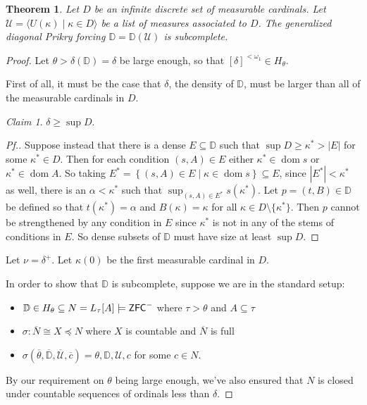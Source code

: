 \documentclass{amsart}
\newtheorem{theorem}{Theorem}[section]
\theoremstyle{definition}
\theoremstyle{remark}
\newtheorem{claimno}{Claim}
\newcommand{\D}{\mathbb{D}}
\newcommand{\N}{{\overline{N}}}
\newcommand{\U}{\mathcal{U}}
\newcommand{\ZFC}{\textup{\ensuremath{\textsf{ZFC}}}}
\DeclareMathOperator{\otp}{otp}
\DeclareMathOperator{\dom}{dom}
\newcommand{\st}{\; | \;}
\newcommand{\set}[2]{\left\{#1\st #2 \right\}}
\begin{document}
\begin{theorem} Let $D$ be an infinite discrete set of measurable cardinals. %
Let $\U = \langle U(\kappa) \;|\; \kappa \in D \rangle$ be a list of measures associated to $D$. The generalized diagonal Prikry forcing $\D=\D(\U)$ is subcomplete. \end{theorem}
\begin{proof} 
Let $\theta > \delta(\D) =\delta$ be large enough, so that $[\delta]^{<\omega_1} \in H_\theta$. 

First of all, it must be the case that $\delta$, the density of $\D$, must be larger than all of the measurable cardinals in $D$.
\begin{claimno} $\delta \geq \sup D$. \end{claimno}
\begin{proof}[Pf.] Suppose instead that there is a dense $E \subseteq \D$ such that $\sup D \geq \kappa^* >|E|$ for some $\kappa^* \in D$. Then for each condition $(s,A) \in E$ either $\kappa^* \in \dom s$ or $\kappa^* \in \dom A$. So taking $E^*=\set{ (s, A) \in E }{ \kappa \in \dom s } \subseteq E$, since $|E^*| < \kappa^*$ as well, there is an $\alpha<\kappa^*$ such that $\sup_{(s,A) \in E^*} s(\kappa^*)$. Let $p=(t, B) \in \D$ be defined so that $t(\kappa^*)=\alpha$ and $B(\kappa)=\kappa$ for all $\kappa \in D \setminus \{ \kappa^*\}$. Then $p$ cannot be strengthened by any condition in $E$ since $\kappa^*$ is not in any of the stems of conditions in $E$. So dense subsets of $\D$ must have size at least $\sup D$.\end{proof}

Let $\nu = \delta^+$. Let $\kappa(0)$ be the first measurable cardinal in $D$. %

In order to show that $\D$ is subcomplete, suppose we are in the standard setup: \begin{itemize}
	\item $\D \in H_\theta \subseteq N = L_\tau[A] \models \ZFC^-$ where $\tau>\theta$ and $A \subseteq \tau$
	\item $\sigma: \N \cong X \preccurlyeq N$ where $X$ is countable and $\N$ is full
	\item $\sigma(\overline \theta, \overline{\D}, \overline{\U}, \overline c)=\theta, \D, \U, c$ for some $c \in N$.
\end{itemize}
By our requirement on $\theta$ being large enough, we've also ensured that $N$ is closed under countable sequences of ordinals less than $\delta$.


\end{proof}
\end{document}

